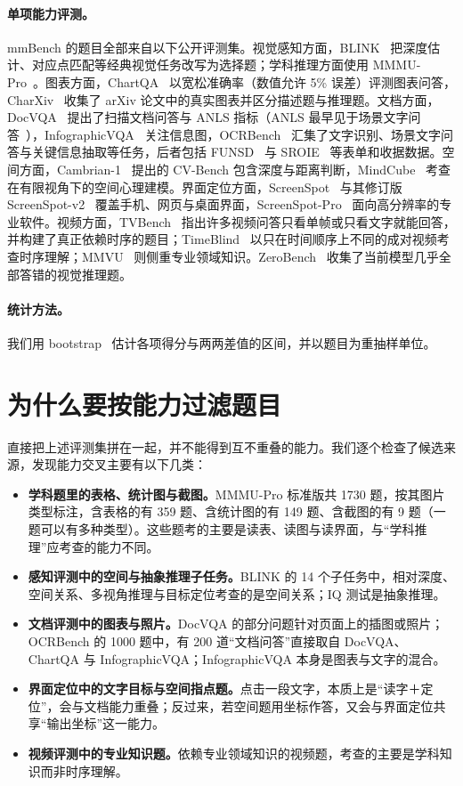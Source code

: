 \documentclass[11pt,a4paper,fontset=none]{ctexart}
\newcommand{\lead}[1]{\textbf{#1}\quad}
\begin{document}
\paragraph{单项能力评测。}mmBench 的题目全部来自以下公开评测集。视觉感知方面，BLINK~\cite{blink} 把深度估计、对应点匹配等经典视觉任务改写为选择题；学科推理方面使用 MMMU-Pro~\cite{mmmupro}。图表方面，ChartQA~\cite{chartqa} 以宽松准确率（数值允许 5\% 误差）评测图表问答，CharXiv~\cite{charxiv} 收集了 arXiv 论文中的真实图表并区分描述题与推理题。文档方面，DocVQA~\cite{docvqa} 提出了扫描文档问答与 ANLS 指标（ANLS 最早见于场景文字问答~\cite{anls}），InfographicVQA~\cite{infovqa} 关注信息图，OCRBench~\cite{ocrbench} 汇集了文字识别、场景文字问答与关键信息抽取等任务，后者包括 FUNSD~\cite{funsd} 与 SROIE~\cite{sroie} 等表单和收据数据。空间方面，Cambrian-1~\cite{cambrian} 提出的 CV-Bench 包含深度与距离判断，MindCube~\cite{mindcube} 考查在有限视角下的空间心理建模。界面定位方面，ScreenSpot~\cite{seeclick} 与其修订版 ScreenSpot-v2~\cite{osatlas} 覆盖手机、网页与桌面界面，ScreenSpot-Pro~\cite{screenspotpro} 面向高分辨率的专业软件。视频方面，TVBench~\cite{tvbench} 指出许多视频问答只看单帧或只看文字就能回答，并构建了真正依赖时序的题目；TimeBlind~\cite{timeblind} 以只在时间顺序上不同的成对视频考查时序理解；MMVU~\cite{mmvu} 则侧重专业领域知识。ZeroBench~\cite{zerobench} 收集了当前模型几乎全部答错的视觉推理题。

\paragraph{统计方法。}我们用 bootstrap~\cite{efron1979} 估计各项得分与两两差值的区间，并以题目为重抽样单位。

\section{为什么要按能力过滤题目}
\label{sec:overlap}

直接把上述评测集拼在一起，并不能得到互不重叠的能力。我们逐个检查了候选来源，发现能力交叉主要有以下几类：

\begin{itemize}[leftmargin=1.6em]
  \item \lead{学科题里的表格、统计图与截图。}MMMU-Pro 标准版共 1730 题，按其图片类型标注，含表格的有 359 题、含统计图的有 149 题、含截图的有 9 题（一题可以有多种类型）。这些题考的主要是读表、读图与读界面，与“学科推理”应考查的能力不同。
  \item \lead{感知评测中的空间与抽象推理子任务。}BLINK 的 14 个子任务中，相对深度、空间关系、多视角推理与目标定位考查的是空间关系；IQ 测试是抽象推理。
  \item \lead{文档评测中的图表与照片。}DocVQA 的部分问题针对页面上的插图或照片；OCRBench 的 1000 题中，有 200 道“文档问答”直接取自 DocVQA、ChartQA 与 InfographicVQA；InfographicVQA 本身是图表与文字的混合。
  \item \lead{界面定位中的文字目标与空间指点题。}点击一段文字，本质上是“读字＋定位”，会与文档能力重叠；反过来，若空间题用坐标作答，又会与界面定位共享“输出坐标”这一能力。
  \item \lead{视频评测中的专业知识题。}依赖专业领域知识的视频题，考查的主要是学科知识而非时序理解。
\end{itemize}
\end{document}
